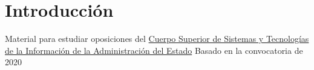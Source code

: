 \section{Introducción}

Material para estudiar oposiciones del 
\href{https://www.boe.es/boe/dias/2020/07/31/pdfs/BOE-A-2020-8872.pdf}{Cuerpo Superior de Sistemas y Tecnologías de la Información de la Administración del Estado} Basado en la convocatoria de 2020